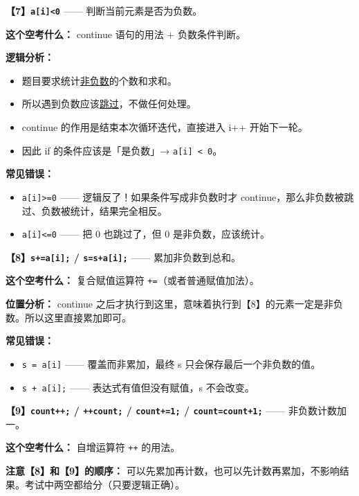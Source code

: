\vspace{0.6em}
\textbf{【7】\texttt{a[i]<0}} —— 判断当前元素是否为负数。

\vspace{0.3em}
\textbf{这个空考什么：} continue 语句的用法 + 负数条件判断。

\textbf{逻辑分析：}
\begin{itemize}
    \item 题目要求统计\underline{非负数}的个数和求和。
    \item 所以遇到负数应该\underline{跳过}，不做任何处理。
    \item continue 的作用是结束本次循环迭代，直接进入 i++ 开始下一轮。
    \item 因此 if 的条件应该是「是负数」→ \texttt{a[i] < 0}。
\end{itemize}

\textbf{常见错误：}
\begin{itemize}
    \item \texttt{a[i]>=0} —— 逻辑反了！如果条件写成非负数时才 continue，那么非负数被跳过、负数被统计，结果完全相反。
    \item \texttt{a[i]<=0} —— 把 0 也跳过了，但 0 是非负数，应该统计。
\end{itemize}

\vspace{0.6em}
\textbf{【8】\texttt{s+=a[i];} / \texttt{s=s+a[i];}} —— 累加非负数到总和。

\vspace{0.3em}
\textbf{这个空考什么：} 复合赋值运算符 \texttt{+=}（或者普通赋值加法）。

\textbf{位置分析：} continue 之后才执行到这里，意味着执行到【8】的元素一定是非负数。所以这里直接累加即可。

\textbf{常见错误：}
\begin{itemize}
    \item \texttt{s = a[i]} —— 覆盖而非累加，最终 s 只会保存最后一个非负数的值。
    \item \texttt{s + a[i];} —— 表达式有值但没有赋值，s 不会改变。
\end{itemize}

\vspace{0.6em}
\textbf{【9】\texttt{count++;} / \texttt{++count;} / \texttt{count+=1;} / \texttt{count=count+1;}} —— 非负数计数加一。

\vspace{0.3em}
\textbf{这个空考什么：} 自增运算符 \texttt{++} 的用法。

\textbf{注意【8】和【9】的顺序：} 可以先累加再计数，也可以先计数再累加，不影响结果。考试中两空都给分（只要逻辑正确）。

